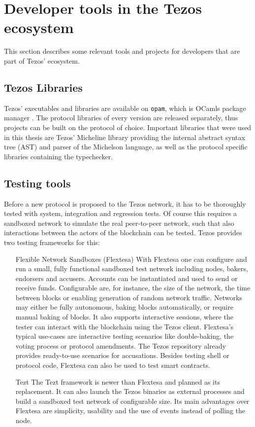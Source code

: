 
\section{Developer tools in the Tezos ecosystem}
This section describes some relevant tools and projects for developers that are part of Tezos' ecosystem.

\subsection{Tezos Libraries}
Tezos' executables and libraries are available on \texttt{opam}, which is OCamls package manager \cite{tezos_opam}. The protocol libraries of every version are released separately, thus projects can be built on the protocol of choice. Important libraries that were used in this thesis are Tezos' Micheline library providing the internal abstract syntax tree (AST) and parser of the Michelson language, as well as the protocol specific libraries containing the typechecker.

\subsection{Testing tools}
Before a new protocol is proposed to the Tezos network, it has to be thoroughly tested with system, integration and regression tests. Of course this requires a sandboxed network to simulate the real peer-to-peer network, such that also interactions between the actors of the blockchain can be tested. Tezos provides two testing frameworks for this:

\begin{itemize}
\item[Flexible Network Sandboxes (Flextesa)] With Flextesa one can configure and run a small, fully functional sandboxed test network including nodes, bakers, endorsers and accusers. Accounts can be instantiated and used to send or receive funds. Configurable are, for instance, the size of the network, the time between blocks or enabling generation of random network traffic. Networks may either be fully autonomous, baking blocks automatically, or require manual baking of blocks. It also supports interactive sessions, where the tester can interact with the blockchain using the Tezos client. Flextesa's typical use-cases are interactive testing scenarios like double-baking, the voting process or protocol amendments. The Tezos repository already provides ready-to-use scenarios for accusations. Besides testing shell or protocol code, Flextesa can also be used to test smart contracts.\cite{tezos docs}
\item[Tezt] The Tezt framework is newer than Flextesa and planned as its replacement. It can also launch the Tezos binaries as external processes and build a sandboxed test network of configurable size. Its main advantages over Flextesa are simplicity, usability and the use of events instead of polling the node.\cite{tezos_docs_tezt}
\end{itemize}


